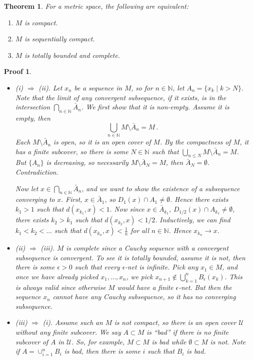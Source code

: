 \documentclass{article}
\theoremstyle{plain}\theoremheaderfont{\normalfont\itshape}\theorembodyfont{\rmfamily}\theoremseparator{.}\newtheorem*{rem}{Remark}\newtheorem*{ex}{Example}\newtheorem*{proof}{Proof}\newtheorem*{altp}{Alternative proof}
\theoremstyle{plain}\theoremheaderfont{\normalfont\bfseries}\theorembodyfont{\rmfamily}\theoremseparator{.}\newtheorem{thm}{Theorem}[section]\newtheorem{lem}[thm]{Lemma}\newtheorem{prop}[thm]{Proposition}\newtheorem*{cor}{Corollary}\newtheorem{defn}[thm]{Definition}\newtheorem{clm}[thm]{Claim}\newtheorem{clminproof}{Claim}
\theoremstyle{break}\theoremheaderfont{\normalfont\itshape}\theorembodyfont{\rmfamily}\theoremseparator{.\medskip}\newtheorem*{proofskip}{Proof}\newtheorem*{exs}{Examples}\newtheorem*{rems}{Remarks}
\theoremstyle{break}\theoremheaderfont{\normalfont\bfseries}\theorembodyfont{\rmfamily}\theoremseparator{.\medskip}\newtheorem{lemskip}[thm]{Lemma}\newtheorem{defnskip}[thm]{Definition}\newtheorem{propskip}[thm]{Proposition}\newtheorem{thmskip}[thm]{Theorem}
\begin{document}
    \begin{thm}
        For a metric space, the following are equivalent:
        \begin{enumerate}[label=(\roman*),topsep=0pt]
            \item \(M\) is compact.
            \item \(M\) is sequentially compact.
            \item \(M\) is totally bounded and complete.
        \end{enumerate}
    \end{thm}
    \begin{proofskip}
        \begin{itemize}[topsep=0pt]
            \item (i) \(\Rightarrow\) (ii). Let \(x_n\) be a sequence in \(M\), so for \(n\in\mathbb{N}\), let \(A_n=\{x_k\mid k>N\}\). Note that the limit of any convergent subsequence, if it exists, is in the intersection \(\bigcap_{n\in\mathbb{N}}\bar{A}_n\). We first show that it is non-empty. Assume it is empty, then
            \[\bigcup_{n\in\mathbb{N}}M\setminus\bar{A}_n=M\,.\]
            Each \(M\setminus\bar{A}_n\) is open, so it is an open cover of \(M\). By the compactness of \(M\), it has a finite subcover, so there is some \(N\in\mathbb{N}\) such that \(\bigcup_{n\le N}M\setminus\bar{A}_n=M\). But \(\{A_n\}\) is decreasing, so necessarily \(M\setminus\bar{A}_N=M\), then \(\bar{A}_N=\emptyset\). Contradiction.

            Now let \(x\in\bigcap_{n\in\mathbb{N}}\bar{A}_n\), and we want to show the existence of a subsequence converging to \(x\). First, \(x\in\bar{A}_1\), so \(D_1(x)\cap A_1\ne\emptyset\). Hence there exists \(k_1>1\) such that \(d(x_{k_1},x)<1\). Now since \(x\in\bar{A}_{k_1}\), \(D_{1/2}(x)\cap A_{k_1}\ne\emptyset\), there exists \(k_2>k_1\) such that \(d(x_{k_2},x)<1/2\). Inductively, we can find \(k_1<k_2<\dots\) such that \(d(x_{k_n},x)<\frac{1}{n}\) for all \(n\in\mathbb{N}\). Hence \(x_{k_n}\to x\). 
            \item (ii) \(\Rightarrow\) (iii). \(M\) is complete since a Cauchy sequence with a convergent subsequence is convergent. To see it is totally bounded, assume it is not, then there is some \(\epsilon>0\) such that every \(\epsilon\)-net is infinite. Pick any \(x_1\in M\), and once we have already picked \(x_1,\dots,x_n\), we pick \(x_{n+1}\not\in\bigcup_{k=1}^{n}B_\epsilon(x_k)\). This is always valid since otherwise \(M\) would have a finite \(\epsilon\)-net. But then the sequence \(x_n\) cannot have any Cauchy subsequence, so it has no converging subsequence.
            \item (iii) \(\Rightarrow\) (i). Assume such an \(M\) is not compact, so there is an open cover \(\mathscr{U}\) without any finite subcover. We say \(A\subset M\) is ``bad'' if there is no finite subcover of \(A\) in \(\mathscr{U}\). So, for example, \(M\subset M\) is bad while \(\emptyset\subset M\) is not. Note if \(A=\cup_{i=1}^{n}B_i\) is bad, then there is some \(i\) such that \(B_i\) is bad.
            

\end{itemize}
\end{proofskip}
\end{document}
